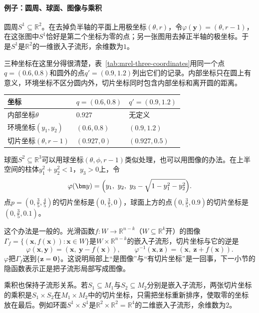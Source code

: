 \paragraph{例子：圆周、球面、图像与乘积}
圆周$S^1\subseteq\mathbb R^2$。在去掉负半轴的平面上用极坐标$(\theta,r)$，令$\varphi(\bm y)=(\theta,r-1)$，在这张图中$S^1$恰好是第二个坐标为零的点；另一张图用去掉正半轴的极坐标。于是$S^1$是$\mathbb R^2$的一维嵌入子流形，余维数为$1$。

三种坐标在这里分得很清楚，表~\ref{tab:mrel-three-coordinates}用同一个点$q=(0.6,0.8)$和圆外的点$q'=(0.9,1.2)$列出它们的记录。内部坐标只在圆上有意义，环境坐标不区分圆内外，切片坐标同时包含内部坐标和离开圆的距离。

\begin{BookInlineTable}
  \centering
  \begin{tabular}{lll}
    \toprule
    坐标 & $q=(0.6,0.8)$ & $q'=(0.9,1.2)$\\
    \midrule
    内部坐标$\theta$ & $0.927$ & 无定义\\
    环境坐标$(y_1,y_2)$ & $(0.6,0.8)$ & $(0.9,1.2)$\\
    切片坐标$(\theta,r-1)$ & $(0.927,0)$ & $(0.927,0.5)$\\
    \bottomrule
  \end{tabular}
  \caption{圆周的内部坐标、环境坐标与切片坐标。}
  \label{tab:mrel-three-coordinates}
\end{BookInlineTable}

球面$S^2\subseteq\mathbb R^3$可以用球坐标$(\theta,\phi,r-1)$类似处理，也可以用图像的办法。在上半空间的柱体$y_1^2+y_2^2<1$，$y_3>0$上，令
\[
\varphi(\bm y)=\Bigl(y_1,\ y_2,\ y_3-\sqrt{1-y_1^2-y_2^2}\Bigr).
\]
点$p=(0,\tfrac35,\tfrac45)$的切片坐标是$(0,\tfrac35,0)$，球面上方的点$(0,\tfrac35,0.9)$的切片坐标是$(0,\tfrac35,0.1)$。

这个办法是一般的。光滑函数$f:W\to\mathbb R^{n-k}$（$W\subseteq\mathbb R^k$开）的图像$\Gamma_f=\{(\bm x,f(\bm x)):\bm x\in W\}$是$W\times\mathbb R^{n-k}$的嵌入子流形，切片坐标与它的逆是
\[
\varphi(\bm x,\bm y)=(\bm x,\ \bm y-f(\bm x)),\qquad
\varphi^{-1}(\bm x,\bm z)=(\bm x,\ \bm z+f(\bm x)).
\]
$\varphi$把$\Gamma_f$送到$\{\bm z=\bm 0\}$。这说明局部上“是图像”与“有切片坐标”是一回事，下一小节的隐函数表示正是把子流形局部写成图像。

乘积也保持子流形关系。若$S_1\subseteq M_1$与$S_2\subseteq M_2$分别是嵌入子流形，两张切片坐标的乘积是$S_1\times S_2$在$M_1\times M_2$中的切片坐标，只需把坐标重新排序，使取零的坐标放在最后。例如环面$S^1\times S^1$是$\mathbb R^2\times\mathbb R^2=\mathbb R^4$的二维嵌入子流形，余维数为$2$。

